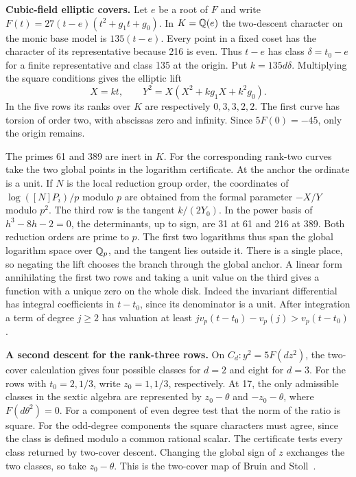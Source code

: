 \textbf{Cubic-field elliptic covers.} Let \(e\) be a root of \(F\) and write
\(F(t)=27(t-e)(t^2+g_1t+g_0)\). In \(K=\mathbb Q(e)\) the
two-descent character on the monic base model is \(135(t-e)\).
Every point in a fixed coset has the character of its representative
because 216 is even. Thus \(t-e\) has class \(\delta=t_0-e\) for a
finite representative and class 135 at the origin. Put \(k=135d\delta\).
Multiplying the square conditions gives the elliptic lift
\[X=kt,\qquad Y^2=X(X^2+kg_1X+k^2g_0).\]
In the five rows its ranks over \(K\) are respectively \(0,3,3,2,2\).
The first curve has torsion of order two, with abscissas zero and
infinity. Since \(5F(0)=-45\), only the origin remains.

The primes 61 and 389 are inert in \(K\). For the corresponding
rank-two curves take the two global points in the logarithm certificate.
At the anchor the ordinate is a unit. If \(N\) is the local reduction
group order, the coordinates of \(\log([N]P_i)/p\) modulo \(p\)
are obtained from the formal parameter \(-X/Y\) modulo \(p^2\).
The third row is the tangent \(k/(2Y_0)\). In the power basis of
\(h^3-8h-2=0\), the determinants, up to sign, are 31 at 61 and
216 at 389. Both reduction orders are prime to \(p\).
The first two logarithms thus span the global logarithm space over
\(\mathbb Q_p\), and the tangent lies outside it. There is a single
place, so negating the lift chooses the branch through the global
anchor. A linear form annihilating the first two rows and taking a
unit value on the third gives a function with a unique zero on the
whole disk. Indeed the invariant differential has integral coefficients
in \(t-t_0\), since its denominator is a unit. After integration a term
of degree \(j\ge2\) has valuation at least
\(jv_p(t-t_0)-v_p(j)>v_p(t-t_0)\).

\textbf{A second descent for the rank-three rows.} On
\(C_d:y^2=5F(dz^2)\), the two-cover calculation gives four possible
classes for \(d=2\) and eight for \(d=3\). For the rows with
\(t_0=2,1/3\), write \(z_0=1,1/3\), respectively. At 17, the
only admissible classes in the sextic algebra are represented by
\(z_0-\theta\) and \(-z_0-\theta\), where \(F(d\theta^2)=0\).
For a component of even degree test that the norm of the ratio is
square. For the odd-degree components the square characters must agree,
since the class is defined modulo a common rational scalar. The
certificate tests every class returned by two-cover descent. Changing
the global sign of \(z\) exchanges the two classes, so take
\(z_0-\theta\). This is the two-cover map of Bruin and Stoll~\cite{BruinStoll}.

